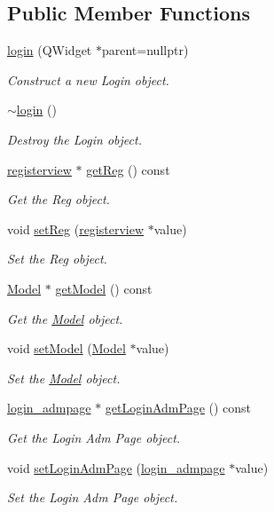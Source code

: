 \subsection*{Public Member Functions}
\begin{DoxyCompactItemize}
\item 
\hyperlink{classlogin_ab0ef02ae84a8c877a3da00c9bb600d44}{login} (Q\+Widget $\ast$parent=nullptr)
\begin{DoxyCompactList}\small\item\em Construct a new Login object. \end{DoxyCompactList}\item 
\hyperlink{classlogin_a4086fe44ad1e40447a0bebbc9b8b3c14}{$\sim$login} ()
\begin{DoxyCompactList}\small\item\em Destroy the Login object. \end{DoxyCompactList}\item 
\hyperlink{classregisterview}{registerview} $\ast$ \hyperlink{classlogin_a4a6b52d07ff54425b77eeb2625c413e7}{get\+Reg} () const
\begin{DoxyCompactList}\small\item\em Get the Reg object. \end{DoxyCompactList}\item 
void \hyperlink{classlogin_a139cc269e6d71c7f2650acff4cf1cd77}{set\+Reg} (\hyperlink{classregisterview}{registerview} $\ast$value)
\begin{DoxyCompactList}\small\item\em Set the Reg object. \end{DoxyCompactList}\item 
\hyperlink{classModel}{Model} $\ast$ \hyperlink{classlogin_a39618a46d937fed5e8d29c652a08ba8d}{get\+Model} () const
\begin{DoxyCompactList}\small\item\em Get the \hyperlink{classModel}{Model} object. \end{DoxyCompactList}\item 
void \hyperlink{classlogin_ae5f30c876e40c092ff18b88ea740d528}{set\+Model} (\hyperlink{classModel}{Model} $\ast$value)
\begin{DoxyCompactList}\small\item\em Set the \hyperlink{classModel}{Model} object. \end{DoxyCompactList}\item 
\hyperlink{classlogin__admpage}{login\+\_\+admpage} $\ast$ \hyperlink{classlogin_a4be030346534b2d066c33c0a28f2eb68}{get\+Login\+Adm\+Page} () const
\begin{DoxyCompactList}\small\item\em Get the Login Adm Page object. \end{DoxyCompactList}\item 
void \hyperlink{classlogin_a30d139e6c1e4eeea8c23776e23cc8e47}{set\+Login\+Adm\+Page} (\hyperlink{classlogin__admpage}{login\+\_\+admpage} $\ast$value)
\begin{DoxyCompactList}\small\item\em Set the Login Adm Page object. \end{DoxyCompactList}\end{DoxyCompactItemize}

